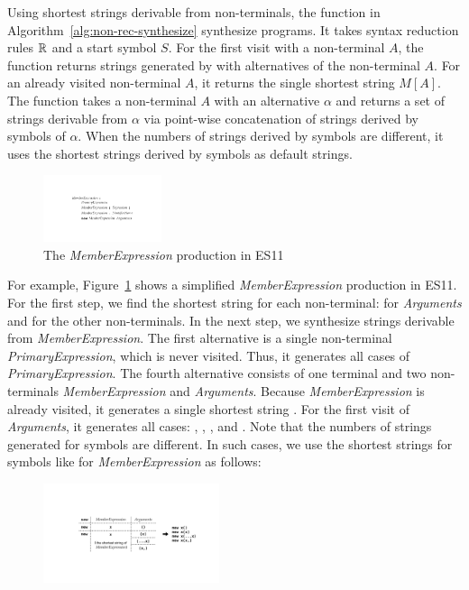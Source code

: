 Using shortest strings derivable from non-terminals, 
the  function in Algorithm~\ref{alg:non-rec-synthesize}
synthesize programs.  It takes syntax reduction rules $\mathbb{R}$ and a start symbol $S$.
For the first visit with a non-terminal $A$, the  function returns
strings generated by  with alternatives of the non-terminal $A$.
For an already visited non-terminal $A$, it returns the single shortest string $M[A]$.
The  function takes a non-terminal $A$ with an alternative
$\alpha$ and returns a set of strings derivable from $\alpha$ via
point-wise concatenation of strings derived by symbols of $\alpha$.
When the numbers of strings derived by symbols are different,
it uses the shortest strings derived by symbols as default strings.

\begin{figure}[t]
  \centering
  \includegraphics[width=0.31\textwidth]{img/syntax-member.pdf}
  \caption{The \textit{MemberExpression} production in ES11}
  \label{fig:prod-example}
  \vspace*{-1em}
\end{figure}

For example, Figure~\ref{fig:prod-example} shows a simplified
\textit{MemberExpression} production in ES11.  For the first step, we find
the shortest string for each non-terminal: \code{()} for \textit{Arguments} and
 for the other non-terminals.  In the next step, we synthesize strings
derivable from \textit{MemberExpression}.  The first alternative is a
single non-terminal \textit{PrimaryExpression}, which is never visited.
Thus, it generates all cases of \textit{PrimaryExpression}.  The fourth
alternative consists of one terminal  and two non-terminals
\textit{MemberExpression} and \textit{Arguments}.  Because \textit{MemberExpression}
is already visited, it generates a single shortest string .
For the first visit of \textit{Arguments}, it generates all cases:
\code{()}, , , and .
Note that the numbers of strings generated for symbols are different.
In such cases, we use the shortest strings for symbols like
 for \textit{MemberExpression} as follows:

\vspace*{-.5em}
\begin{figure}[H]
  \centering
  \includegraphics[width=0.46\textwidth]{img/member-example.pdf}
\end{figure}
\vspace*{-.5em}

